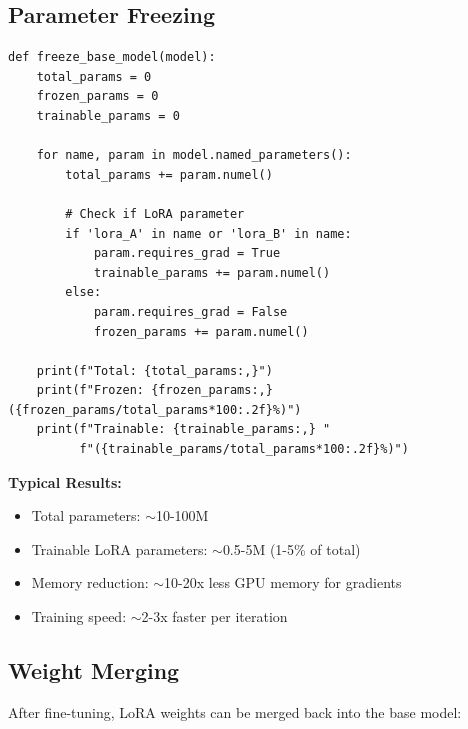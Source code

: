 \documentclass[11pt,a4paper]{article}
\begin{document}
\subsection{Parameter Freezing}

\begin{lstlisting}[caption={Freeze Base Model (lines 289-315)}]
def freeze_base_model(model):
    total_params = 0
    frozen_params = 0
    trainable_params = 0

    for name, param in model.named_parameters():
        total_params += param.numel()

        # Check if LoRA parameter
        if 'lora_A' in name or 'lora_B' in name:
            param.requires_grad = True
            trainable_params += param.numel()
        else:
            param.requires_grad = False
            frozen_params += param.numel()

    print(f"Total: {total_params:,}")
    print(f"Frozen: {frozen_params:,} ({frozen_params/total_params*100:.2f}%)")
    print(f"Trainable: {trainable_params:,} "
          f"({trainable_params/total_params*100:.2f}%)")
\end{lstlisting}

\textbf{Typical Results:}
\begin{itemize}
    \item Total parameters: $\sim$10-100M
    \item Trainable LoRA parameters: $\sim$0.5-5M (1-5\% of total)
    \item Memory reduction: $\sim$10-20x less GPU memory for gradients
    \item Training speed: $\sim$2-3x faster per iteration
\end{itemize}

\subsection{Weight Merging}

After fine-tuning, LoRA weights can be merged back into the base model:
\end{document}

